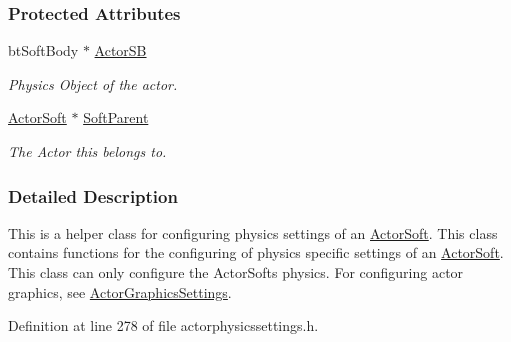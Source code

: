 \subsubsection*{Protected Attributes}
\begin{DoxyCompactItemize}
\item 
\hypertarget{classphys_1_1ActorSoftPhysicsSettings_a0258a8c8ab634b6dc26fd86e8edcc25c}{
btSoftBody $\ast$ \hyperlink{classphys_1_1ActorSoftPhysicsSettings_a0258a8c8ab634b6dc26fd86e8edcc25c}{ActorSB}}
\label{classphys_1_1ActorSoftPhysicsSettings_a0258a8c8ab634b6dc26fd86e8edcc25c}

\begin{DoxyCompactList}\small\item\em Physics Object of the actor. \item\end{DoxyCompactList}\item 
\hypertarget{classphys_1_1ActorSoftPhysicsSettings_a94194a1dd89e643b02181010fcad6bc3}{
\hyperlink{classphys_1_1ActorSoft}{ActorSoft} $\ast$ \hyperlink{classphys_1_1ActorSoftPhysicsSettings_a94194a1dd89e643b02181010fcad6bc3}{SoftParent}}
\label{classphys_1_1ActorSoftPhysicsSettings_a94194a1dd89e643b02181010fcad6bc3}

\begin{DoxyCompactList}\small\item\em The Actor this belongs to. \item\end{DoxyCompactList}\end{DoxyCompactItemize}


\subsubsection{Detailed Description}
This is a helper class for configuring physics settings of an \hyperlink{classphys_1_1ActorSoft}{ActorSoft}. This class contains functions for the configuring of physics specific settings of an \hyperlink{classphys_1_1ActorSoft}{ActorSoft}. This class can only configure the ActorSofts physics. For configuring actor graphics, see \hyperlink{classphys_1_1ActorGraphicsSettings}{ActorGraphicsSettings}. 

Definition at line 278 of file actorphysicssettings.h.




